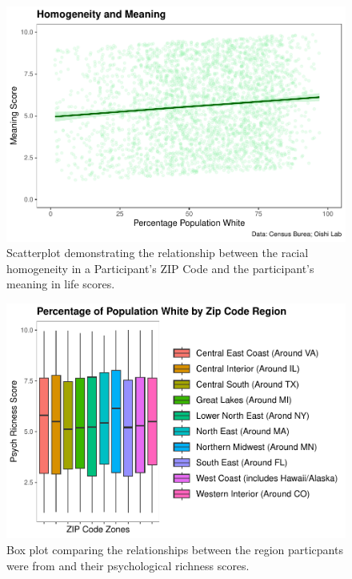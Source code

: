 \documentclass[
  man,floatsintext]{apa7}
\begin{document}
\begin{figure}[H]
\includegraphics[width=1\linewidth]{Richness-Diversity-Markdown_files/figure-latex/c-path-scatterplot-1} \caption{Scatterplot demonstrating the relationship between the racial homogeneity in a Participant's ZIP Code and the participant's meaning in life scores.}\label{fig:meaning-appendix}
\end{figure}

\begin{figure}[H]
\includegraphics[width=1\linewidth]{Richness-Diversity-Markdown_files/figure-latex/f-path-box-1} \caption{Box plot comparing the relationships between the region particpants were from and their psychological richness scores.}\label{fig:box-appendix}
\end{figure}
\end{document}

